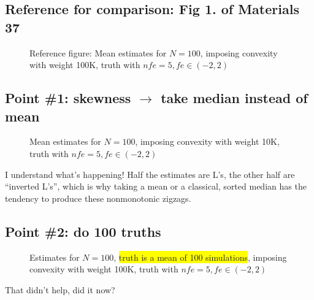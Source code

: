 \documentclass[11pt]{article}
\def \myFigPath {../../figures/}
\renewcommand{\[}{\begin{equation}}
\renewcommand{\]}{\end{equation}}
\def\mySmallFigScale{0.22}
\def\mySmallerFigScale{0.18}
\def\myTinyFigScale{0.16}
\begin{document}
\subsection*{Reference for comparison: Fig 1. of Materials 37}

\begin{figure}[h!]
\hfill
{}
\caption{Reference figure: Mean estimates for $N=100$, imposing convexity with weight 100K, truth with $nfe=5, fe \in(-2,2)$}
\end{figure}

\newpage 
\subsection*{Point \#1: skewness $\rightarrow$ take median instead of mean }

\begin{figure}[h!]
\caption{Mean estimates for $N=100$, imposing convexity with weight 10K, truth with $nfe=5, fe \in(-2,2)$}
\end{figure}
I understand what's happening! Half the estimates are L's, the other half are ``inverted L's'', which is why taking a mean or a classical, sorted median has the tendency to produce these nonmonotonic zigzags.

\subsection*{Point \#2: do 100 truths}
\begin{figure}[h!]
\hfill
{}
\caption{Estimates for $N=100$, \colorbox{yellow}{truth is a mean of 100 simulations}, imposing convexity with weight 100K, truth with $nfe=5, fe \in(-2,2)$}
\end{figure}
That didn't help, did it now?
\end{document}
